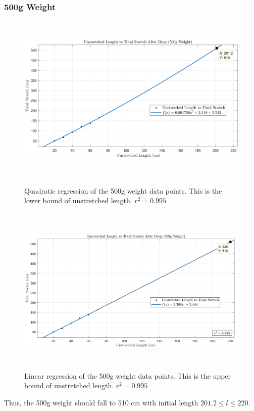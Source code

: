 \documentclass[12pt]{article}
\begin{document}
\subsubsection{500g Weight}
\begin{figure}[h]
    \centering
    \includegraphics[height=8.15cm]{lengthVsStretch500gQuad}
    \caption{Quadratic regression of the 500g weight data points. This is the lower bound of unstretched length. $r^2=0.995$}
    \label{fig:500gQuadratic}
    \vspace*{\floatsep}
    \includegraphics[height=8.15cm]{lengthVsStretch500gLin}
    \caption{Linear regression of the 500g weight data points. This is the upper bound of unstretched length. $r^2=0.995$}
    \label{fig:500gLinear}
\end{figure}
Thus, the 500g weight should fall to 510 cm with initial length $201.2 \leq l \leq 220$.

\newpage
\end{document}
